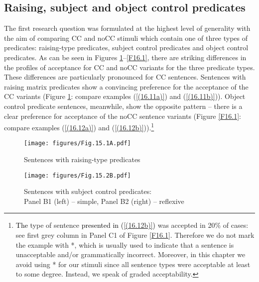 \subsection{Raising, subject and object control predicates}
\label{Raising, subject and object control predicates}
The first research question was formulated at the highest level of generality with the aim of comparing CC and noCC stimuli which contain one of three types of predicates: raising-type predicates, subject control predicates and object control predicates. As can be seen in Figures \ref{Fig.15.1A}--\ref{F16.1}, there are striking differences in the profiles of acceptance for CC and noCC variants for the three predicate types. These differences are particularly pronounced for CC sentences. Sentences with raising matrix predicates show a convincing preference for the acceptance of the CC variants (Figure \ref{Fig.15.1A}: compare examples (\ref{(16.11a)}) and (\ref{(16.11b)})). Object control predicate sentences, meanwhile, show the opposite pattern – there is a clear preference for acceptance of the noCC sentence variants (Figure \ref{F16.1}: compare examples (\ref{(16.12a)}) and (\ref{(16.12b)})).\footnote{\textcolor{black}{The} type of sentence \textcolor{black}{presented in (\ref{(16.12b)})} was accepted in 20\% of cases: see first grey column in Panel C1 of Figure \ref{F16.1}. Therefore we do not mark the example with *, which is usually used to indicate that a sentence is unacceptable and/or grammatically incorrect. Moreover, in this chapter we avoid using * for our stimuli since all sentence types were acceptable at least to some degree. Instead, we speak of graded acceptability. } 

\begin{figure}
\caption{Sentences with raising-type predicates}
\label{Fig.15.1A}
\texttt{[image: figures/Fig.15.1A.pdf]}
\end{figure}

\begin{figure}
\caption{Sentences with subject control predicates: \\ Panel B1 (left) – simple, Panel B2 (right) – reflexive}
\label{Fig.15.2B}
\texttt{[image: figures/Fig.15.2B.pdf]}
\end{figure}

